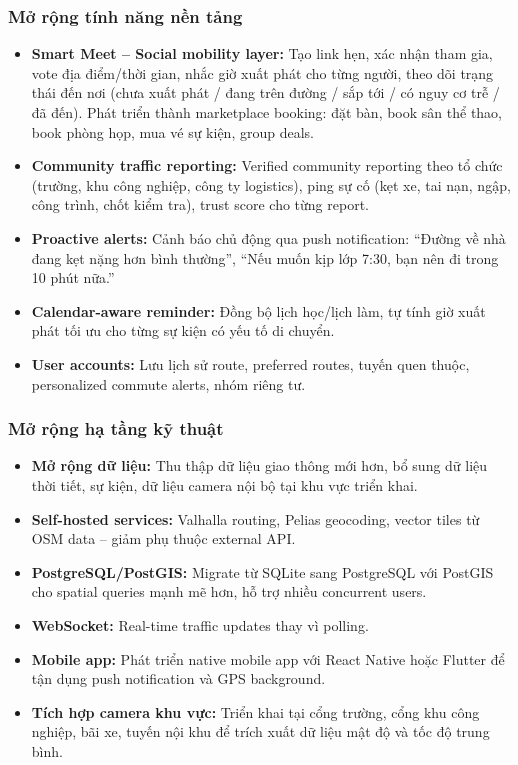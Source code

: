 \documentclass[12pt,a4paper]{article}
\begin{document}
\subsubsection{Mở rộng tính năng nền tảng}
\begin{itemize}[leftmargin=1.2cm]
    \item \textbf{Smart Meet -- Social mobility layer:} Tạo link hẹn, xác nhận tham gia, vote địa điểm/thời gian, nhắc giờ xuất phát cho từng người, theo dõi trạng thái đến nơi (chưa xuất phát / đang trên đường / sắp tới / có nguy cơ trễ / đã đến). Phát triển thành marketplace booking: đặt bàn, book sân thể thao, book phòng họp, mua vé sự kiện, group deals.
    \item \textbf{Community traffic reporting:} Verified community reporting theo tổ chức (trường, khu công nghiệp, công ty logistics), ping sự cố (kẹt xe, tai nạn, ngập, công trình, chốt kiểm tra), trust score cho từng report.
    \item \textbf{Proactive alerts:} Cảnh báo chủ động qua push notification: ``Đường về nhà đang kẹt nặng hơn bình thường'', ``Nếu muốn kịp lớp 7:30, bạn nên đi trong 10 phút nữa.''
    \item \textbf{Calendar-aware reminder:} Đồng bộ lịch học/lịch làm, tự tính giờ xuất phát tối ưu cho từng sự kiện có yếu tố di chuyển.
    \item \textbf{User accounts:} Lưu lịch sử route, preferred routes, tuyến quen thuộc, personalized commute alerts, nhóm riêng tư.
\end{itemize}

\subsubsection{Mở rộng hạ tầng kỹ thuật}
\begin{itemize}[leftmargin=1.2cm]
    \item \textbf{Mở rộng dữ liệu:} Thu thập dữ liệu giao thông mới hơn, bổ sung dữ liệu thời tiết, sự kiện, dữ liệu camera nội bộ tại khu vực triển khai.
    \item \textbf{Self-hosted services:} Valhalla routing, Pelias geocoding, vector tiles từ OSM data -- giảm phụ thuộc external API.
    \item \textbf{PostgreSQL/PostGIS:} Migrate từ SQLite sang PostgreSQL với PostGIS cho spatial queries mạnh mẽ hơn, hỗ trợ nhiều concurrent users.
    \item \textbf{WebSocket:} Real-time traffic updates thay vì polling.
    \item \textbf{Mobile app:} Phát triển native mobile app với React Native hoặc Flutter để tận dụng push notification và GPS background.
    \item \textbf{Tích hợp camera khu vực:} Triển khai tại cổng trường, cổng khu công nghiệp, bãi xe, tuyến nội khu để trích xuất dữ liệu mật độ và tốc độ trung bình.
\end{itemize}
\end{document}
